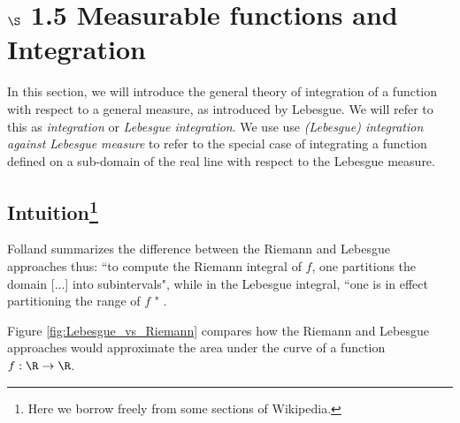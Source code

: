 \documentclass{article} %
\begin{document}

\section{$\S$ 1.5 Measurable functions and Integration}

In this section, we will introduce the general theory of integration of a function with respect to a general measure, as introduced by Lebesgue.  We will refer to this as \textit{integration} or \textit{Lebesgue integration}. We use use \textit{(Lebesgue) integration against Lebesgue measure} to refer to the special case of integrating a function defined on a sub-domain of the real line with respect to the Lebesgue measure.   %

\subsection{Intuition\footnote{Here we borrow freely from some sections of Wikipedia.}} \label{sec:intuition_on_Lebesgue_integration}

Folland summarizes the difference between the Riemann and Lebesgue approaches thus: ``to compute the Riemann integral of $f$, one partitions the domain [...] into subintervals", while in the Lebesgue integral, ``one is in effect partitioning the range of $f$ " \cite{folland1999real}.

Figure \ref{fig:Lebesgue_vs_Riemann} compares how the Riemann and Lebesgue approaches would approximate the area under the curve of a function $f : \R \to \R$. 
\end{document}
